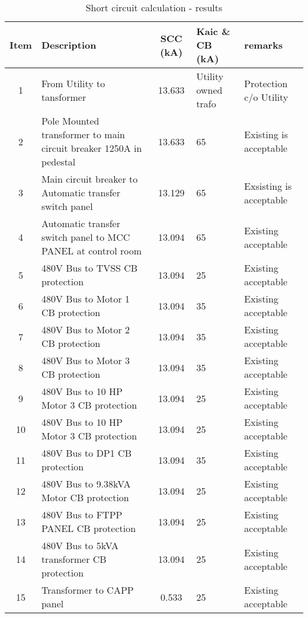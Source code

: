 \begin{table}[!htb]
	\caption{Short circuit calculation - results}
	\label{tbl_ch04_elecaudit_scc}
	{\scriptsize
		
	\begin{tabular}{c|p{4cm}|c|p{3cm}|p{5cm}}
\hline
Item & Description & SCC (kA) & Kaic \& CB (kA) & remarks \\ 
\hline
1 & From Utility to tansformer & 13.633 & Utility owned trafo & Protection c/o Utility \\ 
2 & Pole Mounted transformer to  main circuit breaker 1250A in pedestal & 13.633 & 65 & Existing is acceptable \\ 
3 & Main circuit breaker to Automatic transfer switch panel & 13.129 & 65 & Exsisting is acceptable \\ 
4 & Automatic transfer switch panel to MCC PANEL at control room & 13.094 & 65 & Existing acceptable \\ 
5 & 480V Bus to TVSS CB protection & 13.094 & 25 & Existing acceptable \\ 
6 & 480V Bus to  Motor 1 CB protection & 13.094 & 35 & Existing acceptable \\ 
7 & 480V Bus to  Motor 2 CB protection & 13.094 & 35 & Existing acceptable \\ 
8 & 480V Bus to  Motor 3 CB protection & 13.094 & 35 & Existing acceptable \\ 
9 & 480V Bus to  10 HP Motor 3 CB protection & 13.094 & 25 & Existing acceptable \\ 
10 & 480V Bus to  10 HP Motor 3 CB protection & 13.094 & 25 & Existing acceptable \\ 
11 & 480V Bus to  DP1 CB protection & 13.094 & 35 & Existing acceptable \\ 
12 & 480V Bus to  9.38kVA Motor CB protection & 13.094 & 25 & Existing acceptable \\ 
13 & 480V Bus to  FTPP PANEL CB protection & 13.094 & 25 & Existing acceptable \\ 
14 & 480V Bus to  5kVA transformer CB  protection & 13.094 & 25 & Existing acceptable \\ 
15 & Transformer to CAPP panel & 0.533 & 25 & Existing acceptable \\ 
\hline
	\end{tabular}
	}%
\end{table}
